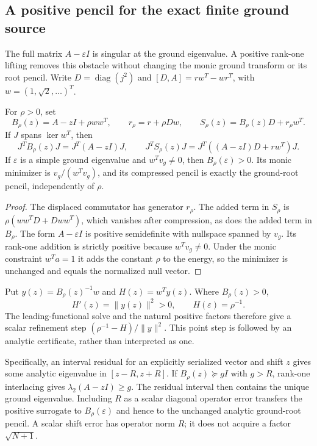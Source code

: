 \subsection{A positive pencil for the exact finite ground source}
\label{ssec:ground-regularization}

The full matrix $A-\varepsilon I$ is singular at the ground eigenvalue.
A positive rank-one lifting removes this obstacle without changing
the monic ground transform or its root pencil. Write
$D=\operatorname{diag}(j^2)$ and $[D,A]=rw^T-wr^T$, with
$w=(1,\sqrt2,\ldots)^T$.

\begin{proposition}
\label{prop:ground-regularization}
For $\rho>0$, set
\[
 B_\rho(z)=A-zI+\rho ww^T,\qquad r_\rho=r+\rho Dw,\qquad
 S_\rho(z)=B_\rho(z)D+r_\rho w^T.
\]
If $J$ spans $\ker w^T$, then
\[
 J^TB_\rho(z)J=J^T(A-zI)J,\qquad
 J^TS_\rho(z)J=J^T((A-zI)D+rw^T)J.
\]
If $\varepsilon$ is a simple ground eigenvalue and
$w^Tv_g\ne0$, then $B_\rho(\varepsilon)>0$. Its monic minimizer
is $v_g/(w^Tv_g)$, and its compressed pencil is exactly the ground-root
pencil, independently of $\rho$.
\end{proposition}
\begin{proof}
The displaced commutator has generator $r_\rho$. The added term in
$S_\rho$ is $\rho(ww^TD+Dww^T)$, which vanishes after compression,
as does the added term in $B_\rho$. The form $A-\varepsilon I$ is
positive semidefinite with nullspace spanned by $v_g$. Its rank-one
addition is strictly positive because $w^Tv_g\ne0$. Under the monic
constraint $w^Ta=1$ it adds the constant $\rho$ to the energy, so the
minimizer is unchanged and equals the normalized null vector.
\end{proof}

Put $y(z)=B_\rho(z)^{-1}w$ and $H(z)=w^Ty(z)$. Where $B_\rho(z)>0$,
\[
 H'(z)=\|y(z)\|^2>0,\qquad H(\varepsilon)=\rho^{-1}.
\]
The leading-functional solve and the natural positive factors therefore
give a scalar refinement step
$(\rho^{-1}-H)/\|y\|^2$. This point step is followed by an analytic
certificate, rather than interpreted as one.

Specifically, an interval residual for an explicitly serialized vector
and shift $z$ gives some analytic eigenvalue in $[z-R,z+R]$. If
$B_\rho(z)\succeq gI$ with $g>R$, rank-one interlacing gives
$\lambda_2(A-zI)\ge g$. The residual interval then contains the unique
ground eigenvalue. Including $R$ as a scalar diagonal operator error
transfers the positive surrogate to $B_\rho(\varepsilon)$ and hence
to the unchanged analytic ground-root pencil. A scalar shift error
has operator norm $R$; it does not acquire a factor $\sqrt{N+1}$.

